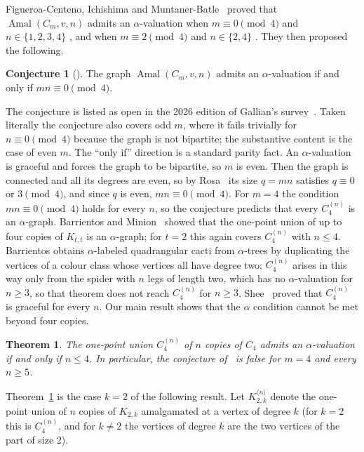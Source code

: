 \documentclass[11pt]{amsart}
\newtheorem{theorem}{Theorem}
\theoremstyle{definition}
\newtheorem*{conjecture*}{Conjecture}
\theoremstyle{remark}
\newcommand{\Amal}{\operatorname{Amal}}
\begin{document}
Figueroa-Centeno, Ichishima and Muntaner-Batle~\cite{FIM} proved that $\Amal(C_m,v,n)$ admits an $\alpha$-valuation when $m \equiv 0 \pmod 4$ and $n \in \{1,2,3,4\}$ \cite[Theorem~3.8]{FIM}, and when $m \equiv 2 \pmod 4$ and $n \in \{2,4\}$ \cite[Theorem~3.9]{FIM}. They then proposed the following.

\begin{conjecture*}[{\cite[Conjecture~3.10]{FIM}}]
The graph $\Amal(C_m,v,n)$ admits an $\alpha$-valuation if and only if $mn \equiv 0 \pmod 4$.
\end{conjecture*}

The conjecture is listed as open in the 2026 edition of Gallian's survey~\cite[\S3.1]{Gallian}. Taken literally the conjecture also covers odd $m$, where it fails trivially for $n \equiv 0 \pmod 4$ because the graph is not bipartite; the substantive content is the case of even $m$. The ``only if'' direction is a standard parity fact. An $\alpha$-valuation is graceful and forces the graph to be bipartite, so $m$ is even. Then the graph is connected and all its degrees are even, so by Rosa~\cite{Rosa} its size $q = mn$ satisfies $q \equiv 0$ or $3 \pmod 4$, and since $q$ is even, $mn \equiv 0 \pmod 4$. For $m = 4$ the condition $mn \equiv 0 \pmod 4$ holds for every $n$, so the conjecture predicts that every $C_4^{(n)}$ is an $\alpha$-graph. Barrientos and Minion~\cite{BM2019} showed that the one-point union of up to four copies of $K_{t,t}$ is an $\alpha$-graph; for $t = 2$ this again covers $C_4^{(n)}$ with $n \le 4$. Barrientos \cite[Theorem~6.3]{Barrientos2022} obtains $\alpha$-labeled quadrangular cacti from $\alpha$-trees by duplicating the vertices of a colour class whose vertices all have degree two; $C_4^{(n)}$ arises in this way only from the spider with $n$ legs of length two, which has no $\alpha$-valuation for $n \ge 3$, so that theorem does not reach $C_4^{(n)}$ for $n \ge 3$. Shee~\cite{Shee} proved that $C_4^{(n)}$ is graceful for every $n$. Our main result shows that the $\alpha$ condition cannot be met beyond four copies.

\begin{theorem}\label{thm:C4}
The one-point union $C_4^{(n)}$ of $n$ copies of $C_4$ admits an $\alpha$-valuation if and only if $n \le 4$. In particular, the conjecture of~\cite{FIM} is false for $m = 4$ and every $n \ge 5$.
\end{theorem}

Theorem~\ref{thm:C4} is the case $k = 2$ of the following result. Let $K_{2,k}^{\langle n\rangle}$ denote the one-point union of $n$ copies of $K_{2,k}$ amalgamated at a vertex of degree $k$ (for $k = 2$ this is $C_4^{(n)}$, and for $k \ne 2$ the vertices of degree $k$ are the two vertices of the part of size $2$).
\end{document}
